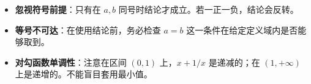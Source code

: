 \begin{trapbox}
\begin{itemize}
    \item \textbf{忽视符号前提}：只有在 $a, b$ 同号时结论才成立。若一正一负，结论会反转。
    \item \textbf{等号不可达}：在使用结论前，务必检查 $a=b$ 这一条件在给定定义域内是否能够取到。
    \item \textbf{对勾函数单调性}：注意在区间 $(0, 1)$ 上，$x+1/x$ 是递减的；在 $(1, +\infty)$ 上是递增的。不能盲目套用最小值。
\end{itemize}
\end{trapbox}